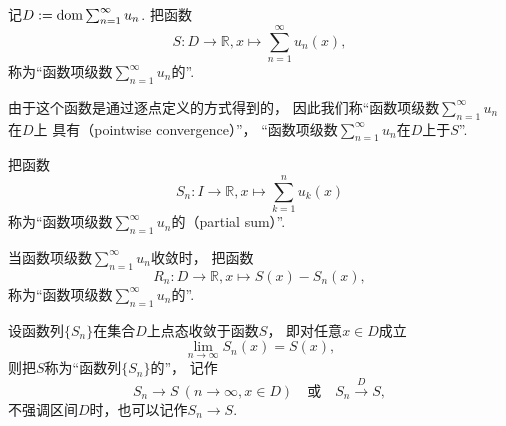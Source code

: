 \begin{definition}
记\(D := \operatorname{dom}\sum_{n=1}^\infty u_n\).
把函数\begin{equation*}
	S\colon D\to\mathbb{R},
	x \mapsto \sum_{n=1}^\infty u_n(x),
\end{equation*}称为“函数项级数\(\sum_{n=1}^\infty u_n\)的”.

由于这个函数是通过逐点定义的方式得到的，
因此我们称“函数项级数\(\sum_{n=1}^\infty u_n\)在\(D\)上
具有（pointwise convergence）”，
“函数项级数\(\sum_{n=1}^\infty u_n\)在\(D\)上于\(S\)”.

把函数\begin{equation*}
	S_n\colon I\to\mathbb{R},
	x \mapsto \sum_{k=1}^n u_k(x)
\end{equation*}称为“函数项级数\(\sum_{n=1}^\infty u_n\)的（partial sum）”.
\end{definition}

\begin{definition}
当函数项级数\(\sum_{n=1}^\infty u_n\)收敛时，
把函数\begin{equation*}
	R_n\colon D\to\mathbb{R},
	x \mapsto S(x) - S_n(x),
\end{equation*}称为“函数项级数\(\sum_{n=1}^\infty u_n\)的”.
\end{definition}

\begin{definition}
设函数列\(\{S_n\}\)在集合\(D\)上点态收敛于函数\(S\)，
即对任意\(x \in D\)成立\begin{equation*}
	\lim_{n\to\infty} S_n(x) = S(x),
\end{equation*}
则把\(S\)称为“函数列\(\{S_n\}\)的”，
记作\begin{equation*}
	S_n \to S\ (n\to\infty,x \in D)
	\quad\text{或}\quad
	S_n \overset{D}\to S,
\end{equation*}
不强调区间\(D\)时，也可以记作\(S_n \to S\).
\end{definition}

